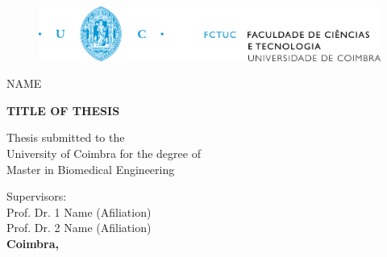 
%

\begin{titlepage}
	
	\centering
	
	\begin{figure}[H]
		\centering
		\includegraphics[width=\linewidth]{../images/title_page/fctuc.jpg}
	\end{figure}
	
	\vspace{90pt}
	{\LARGE NAME}
	
	\vspace{90pt}
	{\huge \bf{TITLE OF THESIS}}
	
	\vspace{45pt}
	{\small Thesis submitted to the \\ University of Coimbra for the degree of \\ Master in Biomedical Engineering}
	
	\vspace{50pt}
	Supervisors: \\
	Prof. Dr. 1 Name (Afiliation) \\
	Prof. Dr. 2 Name (Afiliation) \\
	
	
	
	\vfill
	{\Large \bf{Coimbra, \the\year}}
	
\end{titlepage}